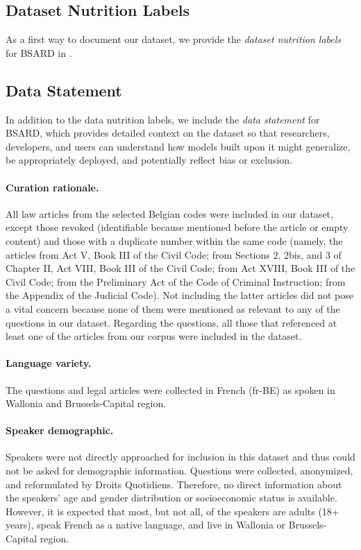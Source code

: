 \documentclass[11pt]{article}
\begin{document}
\subsection{Dataset Nutrition Labels}
As a first way to document our dataset, we provide the \textit{dataset nutrition labels} \citep{holland2018dataset} for BSARD in . 

\subsection{Data Statement}
In addition to the data nutrition labels, we include the \textit{data statement} \citep{bender2018data} for BSARD, which provides detailed context on the dataset so that researchers, developers, and users can understand how models built upon it might generalize, be appropriately deployed, and potentially reflect bias or exclusion.

\paragraph{Curation rationale.} 
All law articles from the selected Belgian codes were included in our dataset, except those revoked (identifiable because mentioned before the article or empty content) and those with a duplicate number within the same code (namely, the articles from Act V, Book III of the Civil Code; from Sections 2, 2bis, and 3 of Chapter II, Act VIII, Book III of the Civil Code; from Act XVIII, Book III of the Civil Code; from the Preliminary Act of the Code of Criminal Instruction; from the Appendix of the Judicial Code). Not including the latter articles did not pose a vital concern because none of them were mentioned as relevant to any of the questions in our dataset. Regarding the questions, all those that referenced at least one of the articles from our corpus were included in the dataset.

\paragraph{Language variety.}
The questions and legal articles were collected in French (fr-BE) as spoken in Wallonia and Brussels-Capital region.

\paragraph{Speaker demographic.}
Speakers were not directly approached for inclusion in this dataset and thus could not be asked for demographic information. Questions were collected, anonymized, and reformulated by Droits Quotidiens. Therefore, no direct information about the speakers’ age and gender distribution or socioeconomic status is available. However, it is expected that most, but not all, of the speakers are adults (18+ years), speak French as a native language, and live in Wallonia or Brussels-Capital region.
\end{document}
